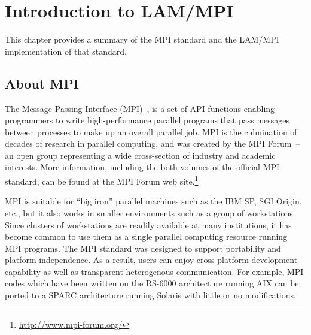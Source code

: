 %
% 
%
%

\chapter{Introduction to LAM/MPI}
\label{sec:introduction}

This chapter provides a summary of the MPI standard and the
LAM/MPI implementation of that standard.

\section{About MPI}

The Message Passing Interface
(MPI)~\cite{geist96:_mpi2_lyon,mpi_forum93:_mpi}, is a set of API
functions enabling programmers to write high-performance parallel
programs that pass messages between processes to make up an
overall parallel job.  MPI is the culmination of decades of research
in parallel computing, and was created by the MPI Forum~-- an open
group representing a wide cross-section of industry and academic
interests.  More information, including the both volumes of the
official MPI standard, can be found at the MPI Forum web
site.\footnote{\url{http://www.mpi-forum.org/}}

MPI is suitable for ``big iron'' parallel machines such as the IBM SP,
SGI Origin, etc., but it also works in smaller environments such as a
group of workstations.  Since clusters of workstations are readily
available at many institutions, it has become common to use them as a
single parallel computing resource running MPI programs.
%
The MPI standard was designed to support portability and platform
independence.  As a result, users can enjoy cross-platform development
capability as well as transparent heterogenous communication.  For
example, MPI codes which have been written on the RS-6000 architecture
running AIX can be ported to a SPARC architecture running Solaris with
little or no modifications.

